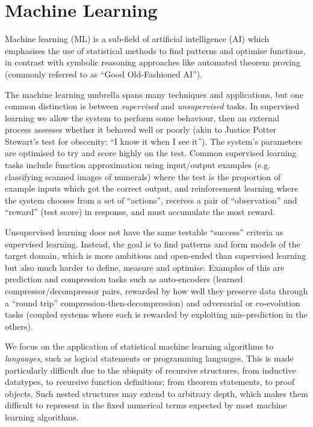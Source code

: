 \section{Machine Learning}

Machine learning (ML) is a sub-field of artificial intelligence (AI) which
emphasises the use of statistical methods to find patterns and optimise
functions, in contrast with symbolic reasoning approaches like automated theorem
proving (commonly referred to as ``Good Old-Fashioned AI'').

The machine learning umbrella spans many techniques and applications, but one
common distinction is between \emph{supervised} and \emph{unsupervised} tasks.
In supervised learning we allow the system to perform some behaviour, then an
external process assesses whether it behaved well or poorly (akin to Justice
Potter Stewart's test for obscenity: ``I know it when I see it''). The system's
parameters are optimised to try and score highly on the test. Common supervised
learning tasks include function approximation using input/output examples (e.g.
classifying scanned images of numerals) where the test is the proportion of
example inputs which got the correct output, and reinforcement learning where
the system chooses from a set of ``actions'', receives a pair of ``observation''
and ``reward'' (test score) in response, and must accumulate the most reward.

Unsupervised learning does not have the same testable ``success'' criteria as
supervised learning. Instead, the goal is to find patterns and form models of
the target domain, which is more ambitious and open-ended than supervised
learning but also much harder to define, measure and optimise. Examples of this
are prediction and compression tasks such as auto-encoders
(learned compressor/decompressor pairs, rewarded by how well they preserve data
through a ``round trip'' compression-then-decompression) and adversarial or
co-evolution tasks (coupled systems where each is rewarded by exploiting
mis-prediction in the others).

We focus on the application of statistical machine learning algorithms to
\emph{languages}, such as logical statements or programming languages, This is
made particularly difficult due to the ubiquity of recursive structures, from
inductive datatypes, to recursive function definitions; from theorem statements,
to proof objects. Such nested structures may extend to arbitrary depth, which
makes them difficult to represent in the fixed numerical terms expected by most
machine learning algorithms.

